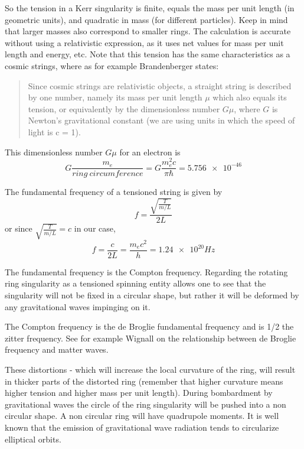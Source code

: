 \documentclass[../rzero]{subfiles}
\begin{document}
So the tension in a Kerr singularity is finite, equals the mass per unit length (in geometric units), and quadratic in mass (for different particles). Keep in mind that larger masses also correspond to smaller rings. The calculation is accurate without using a relativistic expression, as it uses net values for mass per unit length and energy, etc. Note that this tension has the same characteristics as a cosmic strings, where as for example Brandenberger states\cite{Brandenberger2014}:
\begin{quotation}
Since cosmic strings are relativistic objects, a straight string is described by one number, namely its mass per unit length $\mu$ which also equals its tension, or equivalently by the dimensionless number $G\mu$, where $G$ is Newton’s gravitational constant (we are using units in which the speed of light is c = 1).
\end{quotation}
This dimensionless number $G\mu$ for an electron is 
\begin{equation}
	G\frac{m_e}{ring \ circumference} = G \frac{m_e^2c}{\pi\hbar} = \num{5.756e-46}
\end{equation}


The fundamental frequency of a tensioned string is given by 
\begin{equation}
f = \frac{\sqrt{\frac{T}{m/L}}}{2L}
\end{equation}
or since $\sqrt{\frac{T}{m/L}} = c$ in our case, 
\begin{equation}
f = \frac{c}{2L} = \frac{m_e c^2}{h} = \num{1.24e20} Hz
\end{equation}



The fundamental frequency is the Compton frequency. Regarding the rotating ring singularity as a tensioned spinning entity allows one to see that the singularity will not be fixed in a circular shape, but rather it will be deformed by any gravitational waves impinging on it.  

The Compton frequency is the de Broglie fundamental frequency and is 1/2 the zitter frequency. See for example Wignall\cite{Wignall1993} on the relationship between de Broglie frequency and matter waves.

These distortions - which will increase the local curvature of the ring, will result in thicker parts of the distorted ring (remember that higher curvature means higher tension and higher mass per unit length). During  bombardment by gravitational waves the circle of the ring singularity will be pushed into a non circular shape. A non circular ring will have quadrupole moments. It is well known that the emission of gravitational wave radiation tends to circularize elliptical orbits.
\end{document}
